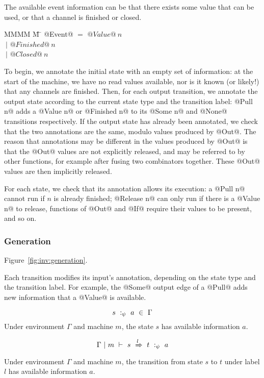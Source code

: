 The available event information can be that there exists some value that can be used, or that a channel is finished or closed.

\begin{tabbing}
MMMM \= M \= \kill
@Event@ \> $=$  \> $@Value@~n$ \\
       \> $~|$ \> $@Finished@~n$ \\
       \> $~|$ \> $@Closed@~n$ \\
\end{tabbing}

To begin, we annotate the initial state with an empty set of information: at the start of the machine, we have no read values available, nor is it known (or likely!) that any channels are finished.
Then, for each output transition, we annotate the output state according to the current state type and the transition label: @Pull n@ adds a @Value n@ or @Finished n@ to its @Some n@ and @None@ transitions respectively.
If the output state has already been annotated, we check that the two annotations are the same, modulo values produced by @Out@.
The reason that annotations may be different in the values produced by @Out@ is that the @Out@ values are not explicitly released, and may be referred to by other functions, for example after fusing two combinators together.
These @Out@ values are then implicitly released.

For each state, we check that its annotation allows its execution: a @Pull n@ cannot run if $n$ is already finished; @Release n@ can only run if there is a @Value n@ to release, functions of @Out@ and @If@ require their values to be present, and so on.



\subsubsection{Generation}
Figure~\ref{fig:inv:generation}.

Each transition modifies its input's annotation, depending on the state type and the transition label.
For example, the @Some@ output edge of a @Pull@ adds new information that a @Value@ is available.

$$ s~:_\psi~ a ~\in~ \Gamma $$
Under environment $\Gamma$ and machine $m$, the state $s$ has available information $a$.

$$ \Gamma ~|~ m ~\vdash~ s~\xRightarrow{l}~t ~:_\psi~ a $$
Under environment $\Gamma$ and machine $m$, the transition from state $s$ to $t$ under label $l$ has available information $a$.

